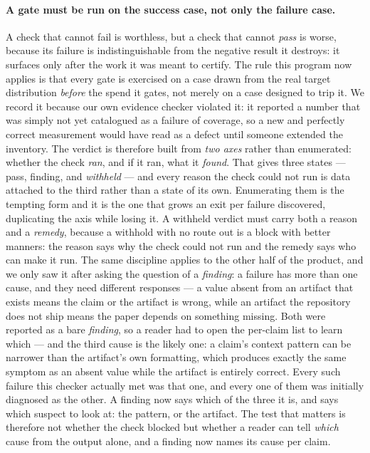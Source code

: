 \documentclass[11pt]{article}
\begin{document}
\paragraph{A gate must be run on the success case, not only the failure case.} A check
that cannot fail is worthless, but a check that cannot \emph{pass} is worse, because
its failure is indistinguishable from the negative result it destroys: it surfaces
only after the work it was meant to certify. The rule this program now applies is
that every gate is exercised on a case drawn from the real target distribution
\emph{before} the spend it gates, not merely on a case designed to trip it. We record
it because our own evidence checker violated it: it reported a number that was simply
not yet catalogued as a failure of coverage, so a new and perfectly correct
measurement would have read as a defect until someone extended the inventory. The
verdict is therefore built from \emph{two axes} rather than enumerated: whether the
check \emph{ran}, and if it ran, what it \emph{found}. That gives three states ---
pass, finding, and \emph{withheld} --- and every reason the check could not run is data
attached to the third rather than a state of its own. Enumerating them is the tempting
form and it is the one that grows an exit per failure discovered, duplicating the axis
while losing it. A withheld verdict must carry both a reason and a \emph{remedy},
because a withhold with no route out is a block with better manners: the reason says
why the check could not run and the remedy says who can make it run. The same
discipline applies to the other half of the product, and we only saw it after asking
the question of a \emph{finding}: a failure has more than one cause, and they need
different responses --- a value absent from an artifact that exists means the claim or
the artifact is wrong, while an artifact the repository does not ship means the paper
depends on something missing. Both were reported as a bare \emph{finding}, so a reader
had to open the per-claim list to learn which --- and the third cause is the
likely one: a claim's context pattern can be narrower than the artifact's own
formatting, which produces exactly the same symptom as an absent value while the
artifact is entirely correct. Every such failure this checker actually met was
that one, and every one of them was initially diagnosed as the other. A finding
now says which of the three it is, and says which suspect to look at: the
pattern, or the artifact. The test that matters is therefore not
whether the check blocked but whether a reader can tell \emph{which} cause from the
output alone, and a finding now names its cause per claim.
\end{document}
